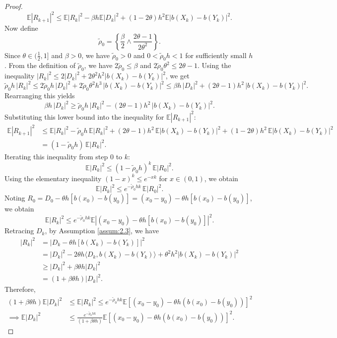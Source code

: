 \documentclass{article}
\begin{document}
\begin{proof}
\[
\mathbb{E}|R_{k+1}|^2 \leq \mathbb{E}|R_k|^2 - \beta h\mathbb{E}|D_k|^2 + (1-2\theta)h^2\mathbb{E}|b(X_k) - b(Y_k)|^2.
\]
Now define
\[
\tilde{\rho}_0 = \left\{\frac{\beta}{2} \wedge \frac{2\theta-1}{2\theta^2}\right\}.
\]
Since $\theta \in (\frac{1}{2},1]$ and $\beta > 0$, we have $\tilde{\rho}_0 > 0$ and $0 < \tilde{\rho}_0 h < 1$ for sufficiently small $h$. From the definition of $\tilde{\rho}_0$, we have $2\tilde{\rho}_0 \leq \beta$ and $2\tilde{\rho}_0 \theta^2 \leq 2\theta - 1$. Using the inequality $|R_k|^2 \leq 2|D_k|^2 + 2\theta^2 h^2 |b(X_k)-b(Y_k)|^2$, we get
\[
\tilde{\rho}_0 h\,|R_k|^2 \leq 2\tilde{\rho}_0 h\,|D_k|^2 + 2\tilde{\rho}_0 \theta^2 h^3\,|b(X_k)-b(Y_k)|^2 \leq \beta h\,|D_k|^2 + (2\theta-1)h^2\,|b(X_k)-b(Y_k)|^2.
\]
Rearranging this yields
\[
\beta h\,|D_k|^2 \geq \tilde{\rho}_0 h\,|R_k|^2 - (2\theta-1)h^2\,|b(X_k)-b(Y_k)|^2.
\]
Substituting this lower bound into the inequality for $\mathbb{E}|R_{k+1}|^2$:
\begin{align*}
	\mathbb{E}|R_{k+1}|^2 &\leq \mathbb{E}|R_k|^2 - \tilde{\rho}_0 h\,\mathbb{E}|R_k|^2 + (2\theta-1)h^2\,\mathbb{E}|b(X_k)-b(Y_k)|^2 + (1-2\theta)h^2\,\mathbb{E}|b(X_k)-b(Y_k)|^2 \\
	&= (1-\tilde{\rho}_0 h)\,\mathbb{E}|R_k|^2.
\end{align*}
Iterating this inequality from step $0$ to $k$:
\[
\mathbb{E}|R_k|^2 \leq (1-\tilde{\rho}_0 h)^k\,\mathbb{E}|R_0|^2.
\]
Using the elementary inequality $(1-x)^k \leq e^{-xk}$ for $x \in (0,1)$, we obtain
\[
\mathbb{E}|R_k|^2 \leq e^{-\tilde{\rho}_0 h k}\,\mathbb{E}|R_0|^2.
\]
Noting $R_0 = D_0 - \theta h[b(x_0) - b(y_0)] = (x_0 - y_0) - \theta h[b(x_0) - b(y_0)]$, we obtain
\[
\mathbb{E}|R_k|^2 \leq e^{-\tilde{\rho}_0 h k} \mathbb{E}\left|(x_0 - y_0) - \theta h[b(x_0) - b(y_0)]\right|^2.
\]
Retracing $D_k$, by Assumption \ref{assum:2.3}, we have
\begin{align*}
	|R_k|^2 &= |D_k - \theta h[b(X_k) - b(Y_k)]|^2 \\
	&= |D_k|^2 - 2\theta h\langle D_k, b(X_k) - b(Y_k) \rangle + \theta^2 h^2 |b(X_k) - b(Y_k)|^2 \\
	&\geq |D_k|^2 + \beta\theta h|D_k|^2 \\
	&= (1 + \beta\theta h)|D_k|^2.
\end{align*}
Therefore,
\begin{align*}
	(1 + \beta \theta h)\mathbb{E} |D_k|^2 &\leq \mathbb{E}|R_k|^2 \leq e^{-\tilde{\rho}_0 h k} \mathbb{E}\left[ (x_0 - y_0) - \theta h (b(x_0) - b(y_0)) \right]^2 \\
	\implies \mathbb{E}|D_k|^2 &\leq \frac{e^{-\tilde{\rho}_0 h k}}{(1 + \beta \theta h)} \mathbb{E}\left[ (x_0 - y_0) - \theta h (b(x_0) - b(y_0)) \right]^2.

\end{align*}
\end{proof}
\end{document}
